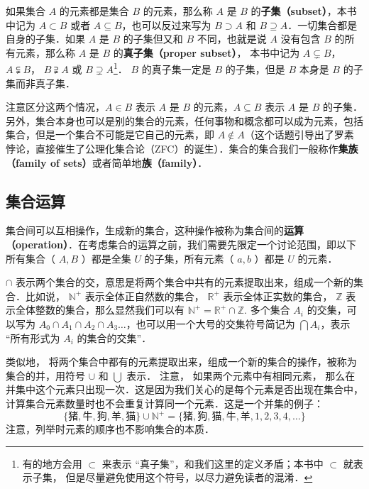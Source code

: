 如果集合 $A$ 的元素都是集合 $B$ 的元素，那么称 $A$ 是 $B$ 的\textbf{子集（subset）}，本书中记为 $A\subset B$ 或者 $A\subseteq B$，也可以反过来写为 $B\supset A$ 和 $B\supseteq A$．一切集合都是自身的子集．如果 $A$ 是 $B$ 的子集但又和 $B$ 不同，也就是说 $A$ 没有包含 $B$ 的所有元素，那么称 $A$ 是 $B$ 的\textbf{真子集（proper subset）}， 本书中记为 $A\subsetneq B$， $A\subsetneqq B$， $B\supsetneqq A$ 或 $B\supsetneq A$\footnote{有的地方会用 $\subset$ 来表示 “真子集”，和我们这里的定义矛盾；本书中 $\subset$ 就表示子集， 但是尽量避免使用这个符号，以尽力避免读者的混淆．}． $B$ 的真子集一定是 $B$ 的子集，但是 $B$ 本身是 $B$ 的子集而非真子集．

注意区分这两个情况，$A \in B$ 表示 $A$ 是 $B$ 的元素，$A \subseteq B$ 表示 $A$ 是 $B$ 的子集．另外，集合本身也可以是别的集合的元素，任何事物和概念都可以成为元素，包括集合，但是一个集合不可能是它自己的元素，即 $A \not\in A$（这个话题引导出了罗素悖论，直接催生了公理化集合论（ZFC）的诞生）．集合的集合我们一般称作\textbf{集族（family of sets）}或者简单地\textbf{族（family）}．

\subsection{集合运算}\label{Set_sub1}

集合间可以互相操作，生成新的集合，这种操作被称为集合间的\textbf{运算（operation）}．在考虑集合的运算之前，我们需要先限定一个讨论范围，即以下所有集合（ $A, B$ ）都是全集 $U$ 的子集，所有元素（ $a, b$ ）都是 $U$ 的元素．

$\cap$ 表示两个集合的交，意思是将两个集合中共有的元素提取出来，组成一个新的集合．比如说， $\mathbb{N^+}$ 表示全体正自然数的集合， $\mathbb{R^+}$ 表示全体正实数的集合， $\mathbb{Z}$ 表示全体整数的集合，那么显然我们可以有 $\mathbb{N^+}=\mathbb{R^+}\cap\mathbb{Z}$. 多个集合 $A_i$ 的交集，可以写为 $A_0\cap A_1\cap A_2\cap A_3\dots$，也可以用一个大号的交集符号简记为 $\bigcap A_i$，表示 “所有形式为 $A_i$ 的集合的交集”．

类似地， 将两个集合中都有的元素提取出来，组成一个新的集合的操作，被称为集合的并，用符号 $\cup$ 和 $\bigcup$ 表示． 注意， 如果两个元素中有相同元素， 那么在并集中这个元素只出现一次．这是因为我们关心的是每个元素是否出现在集合中，计算集合元素数量时也不会重复计算同一个元素．这是一个并集的例子：
\begin{equation}
\{\text{猪}, \text{牛}, \text{狗}, \text{羊}, \text{猫}\}\cup\mathbb{N^+}=\{\text{猪}, \text{狗}, \text{猫}, \text{牛}, \text{羊}, 1, 2,3,4,\dots\}
\end{equation}
注意，列举时元素的顺序也不影响集合的本质．

